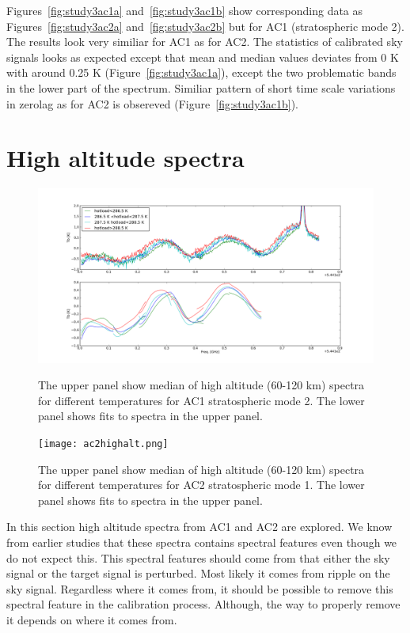  
Figures~\ref{fig:study3ac1a} and~\ref{fig:study3ac1b} show corresponding
data as Figures~\ref{fig:study3ac2a} and~\ref{fig:study3ac2b}
but for AC1 (stratospheric mode 2).
The results look very similiar for AC1 as for AC2.
The statistics of calibrated sky signals looks as expected
except that mean and median values deviates from 0 K
with around 0.25 K (Figure~\ref{fig:study3ac1a}),
except the two problematic bands in the lower part of the
spectrum.
Similiar pattern of short time scale variations in zerolag
as for AC2 is obsereved (Figure~\ref{fig:study3ac1b}).


\clearpage
\newpage
\section{High altitude spectra}   
\begin{figure}[!t]
\centering
\includegraphics[scale=0.35]{ac1highalt.png}\\
\caption{The upper panel show median of high altitude (60-120 km)
spectra for different temperatures for AC1 stratospheric mode 2.
The lower panel shows fits to spectra in the upper panel.}
\label{fig:study3ac1c}
\end{figure}

\begin{figure}[!t]
\centering
\texttt{[image: ac2highalt.png]}\\
\caption{The upper panel show median of high altitude (60-120 km)
spectra for different temperatures for AC2 stratospheric mode 1.
The lower panel shows fits to spectra in the upper panel.}
\label{fig:study3ac2c}
\end{figure}


In this section high altitude spectra from AC1 and AC2 are explored.
We know from earlier studies that these spectra contains
spectral features even though we do not expect this.
This spectral features should come from that either the sky signal
or the target signal is perturbed. Most likely it comes from ripple on the
sky signal. Regardless where it comes from, it should be possible to remove
this spectral feature in the calibration process. Although, the way to
properly remove it depends on where it comes from.

